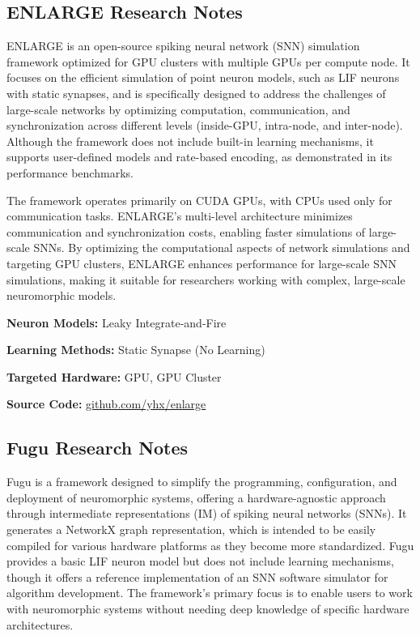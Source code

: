 \subsection*{ENLARGE Research Notes}\label{ENLARGE}

ENLARGE is an open-source spiking neural network (SNN) simulation framework optimized for GPU clusters with multiple GPUs per compute node. It focuses on the efficient simulation of point neuron models, such as LIF neurons with static synapses, and is specifically designed to address the challenges of large-scale networks by optimizing computation, communication, and synchronization across different levels (inside-GPU, intra-node, and inter-node). Although the framework does not include built-in learning mechanisms, it supports user-defined models and rate-based encoding, as demonstrated in its performance benchmarks.

The framework operates primarily on CUDA GPUs, with CPUs used only for communication tasks. ENLARGE's multi-level architecture minimizes communication and synchronization costs, enabling faster simulations of large-scale SNNs. By optimizing the computational aspects of network simulations and targeting GPU clusters, ENLARGE enhances performance for large-scale SNN simulations, making it suitable for researchers working with complex, large-scale neuromorphic models.

\begin{tcolorbox}[enhanced,attach boxed title to top center={yshift=-3mm,yshifttext=-1mm}, colback=blue!5!white,colframe=blue!75!black,colbacktitle=red!80!black, title=ENLARGE at a Glance,fonttitle=\bfseries, boxed title style={size=small,colframe=red!50!black} ]

\textbf{Neuron Models:} Leaky Integrate-and-Fire

\textbf{Learning Methods:} Static Synapse (No Learning)  

\textbf{Targeted Hardware:} GPU, GPU Cluster 

\textbf{Source Code:} \href{https://github.com/yhx/enlarge}{github.com/yhx/enlarge}
\end{tcolorbox}
\subsection*{Fugu Research Notes}\label{Fugu}

Fugu is a framework designed to simplify the programming, configuration, and deployment of neuromorphic systems, offering a hardware-agnostic approach through intermediate representations (IM) of spiking neural networks (SNNs). It generates a NetworkX graph representation, which is intended to be easily compiled for various hardware platforms as they become more standardized. Fugu provides a basic LIF neuron model but does not include learning mechanisms, though it offers a reference implementation of an SNN software simulator for algorithm development. The framework’s primary focus is to enable users to work with neuromorphic systems without needing deep knowledge of specific hardware architectures.

